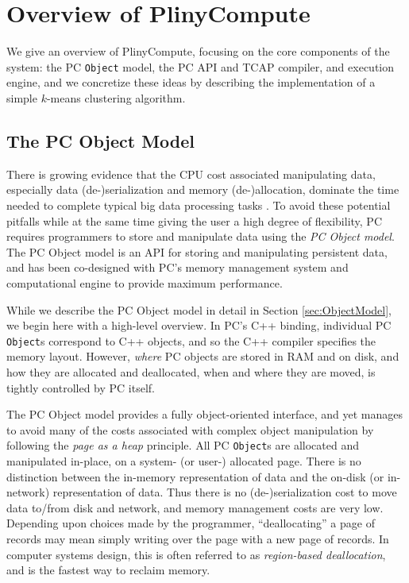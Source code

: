 
\section{Overview of PlinyCompute}

We give an overview of PlinyCompute, focusing on the core components of the
system: the PC \texttt{Object} model, 
the PC API and TCAP compiler, and execution engine, and we concretize these ideas by
describing the implementation of a simple $k$-means clustering algorithm.

\subsection{The PC Object Model}

There is growing evidence that the CPU cost associated manipulating data, especially data (de-)serialization and memory 
(de-)allocation,  
dominate the time needed to complete typical big data processing tasks \cite{}.
To avoid these potential pitfalls while at the same time giving the user a high degree of flexibility,
PC requires programmers to store and manipulate data using the \emph{PC Object model}.
The PC Object model is an API for storing and manipulating persistent
data, and has been co-designed with PC's memory management system and computational engine to provide
maximum performance.  

While we describe the PC Object model in detail in Section \ref{sec:ObjectModel}, we begin here with a high-level overview.
In PC's C++ binding, individual PC \texttt{Object}s correspond to C++ objects, and so the C++ compiler specifies the memory layout.
However, \emph{where} PC objects are stored in RAM and on disk, and how they are allocated and deallocated, when and where they are moved, is
tightly controlled by PC itself.

The PC Object model provides a fully object-oriented interface, and yet manages to avoid many of the costs associated with complex object manipulation
by following the \emph{page as a heap} principle.  
All PC \texttt{Object}s are allocated and manipulated in-place, on a system-
(or user-) allocated page.  There is
no distinction between the in-memory representation of data and the on-disk (or in-network) representation of
data. Thus there is no (de-)serialization cost to move data to/from disk and network, and memory management costs are very low. Depending upon choices made by the
programmer, ``deallocating'' a page of records
may mean simply writing over the page with a new page of records.  In computer systems design, this is often referred to as \emph{region-based deallocation}, and is 
the fastest way to reclaim memory.

